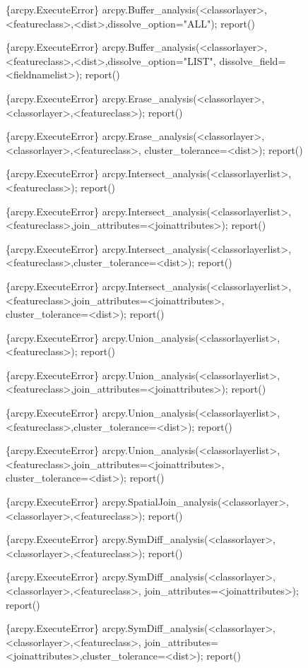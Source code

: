 \begin{figure}
{\begin{code}
\{arcpy.ExecuteError\} arcpy.Buffer\_analysis(<classorlayer>,<featureclass>,<dist>,dissolve\_option="ALL"); report()

\{arcpy.ExecuteError\} arcpy.Buffer\_analysis(<classorlayer>,<featureclass>,<dist>,dissolve\_option="LIST",
   dissolve\_field=<fieldnamelist>); report()

\{arcpy.ExecuteError\} arcpy.Erase\_analysis(<classorlayer>,<classorlayer>,<featureclass>); report()

\{arcpy.ExecuteError\} arcpy.Erase\_analysis(<classorlayer>,<classorlayer>,<featureclass>,
   cluster\_tolerance=<dist>); report()

\{arcpy.ExecuteError\} arcpy.Intersect\_analysis(<classorlayerlist>,<featureclass>); report()

\{arcpy.ExecuteError\} arcpy.Intersect\_analysis(<classorlayerlist>,<featureclass>,join\_attributes=<joinattributes>);
   report()

\{arcpy.ExecuteError\} arcpy.Intersect\_analysis(<classorlayerlist>,<featureclass>,cluster\_tolerance=<dist>); report()

\{arcpy.ExecuteError\} arcpy.Intersect\_analysis(<classorlayerlist>,<featureclass>,join\_attributes=<joinattributes>,
   cluster\_tolerance=<dist>); report()

\{arcpy.ExecuteError\} arcpy.Union\_analysis(<classorlayerlist>,<featureclass>); report()

\{arcpy.ExecuteError\} arcpy.Union\_analysis(<classorlayerlist>,<featureclass>,join\_attributes=<joinattributes>); report()

\{arcpy.ExecuteError\} arcpy.Union\_analysis(<classorlayerlist>,<featureclass>,cluster\_tolerance=<dist>); report()

\{arcpy.ExecuteError\} arcpy.Union\_analysis(<classorlayerlist>,<featureclass>,join\_attributes=<joinattributes>,
   cluster\_tolerance=<dist>); report()

\{arcpy.ExecuteError\} arcpy.SpatialJoin\_analysis(<classorlayer>,<classorlayer>,<featureclass>); report()

\{arcpy.ExecuteError\} arcpy.SymDiff\_analysis(<classorlayer>,<classorlayer>,<featureclass>); report()

\{arcpy.ExecuteError\} arcpy.SymDiff\_analysis(<classorlayer>,<classorlayer>,<featureclass>,
   join\_attributes=<joinattributes>); report()

\{arcpy.ExecuteError\} arcpy.SymDiff\_analysis(<classorlayer>,<classorlayer>,<featureclass>,
   join\_attributes=<joinattributes>,cluster\_tolerance=<dist>); report()


\end{code}}
\end{figure}
